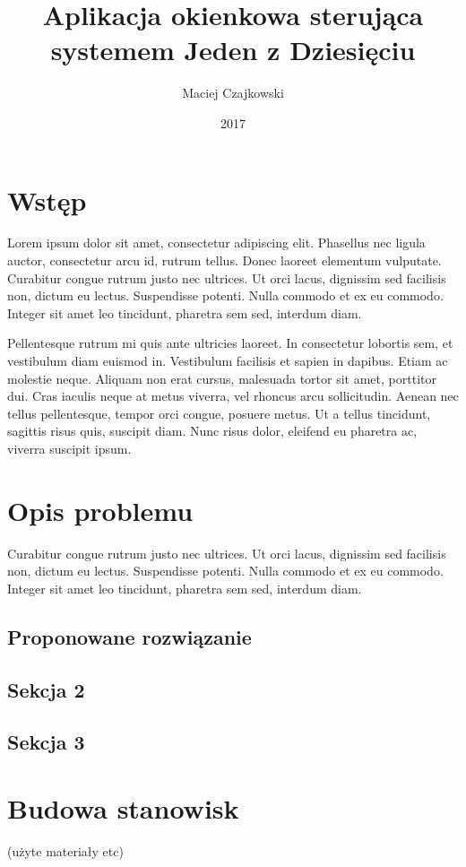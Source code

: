 \documentclass[wmii,inf,mgr]{uwmthesis}
\date{2017}
\title{Aplikacja okienkowa sterująca systemem Jeden z Dziesięciu}
\author{Maciej Czajkowski}
\begin{document}
	
\maketitle
	
\tableofcontents

\chapter*{Wstęp}
Lorem ipsum dolor sit amet, consectetur adipiscing elit. Phasellus nec ligula auctor, consectetur arcu id, rutrum tellus. Donec laoreet elementum vulputate. Curabitur congue rutrum justo nec ultrices. Ut orci lacus, dignissim sed facilisis non, dictum eu lectus. Suspendisse potenti. Nulla commodo et ex eu commodo. Integer sit amet leo tincidunt, pharetra sem sed, interdum diam. 

Pellentesque rutrum mi quis ante ultricies laoreet. In consectetur lobortis sem, et vestibulum diam euismod in. Vestibulum facilisis et sapien in dapibus. Etiam ac molestie neque. Aliquam non erat cursus, malesuada tortor sit amet, porttitor dui. Cras iaculis neque at metus viverra, vel rhoncus arcu sollicitudin. Aenean nec tellus pellentesque, tempor orci congue, posuere metus. Ut a tellus tincidunt, sagittis risus quis, suscipit diam. Nunc risus dolor, eleifend eu pharetra ac, viverra suscipit ipsum.

\chapter{Opis problemu}
Curabitur congue rutrum justo nec ultrices. Ut orci lacus, dignissim sed facilisis non, dictum eu lectus. Suspendisse potenti. Nulla commodo et ex eu commodo. Integer sit amet leo tincidunt, pharetra sem sed, interdum diam.
\section{Proponowane rozwiązanie}
\section{Sekcja 2}
\section{Sekcja 3}

\chapter{Budowa stanowisk}
(użyte materiały etc)
\end{document}
